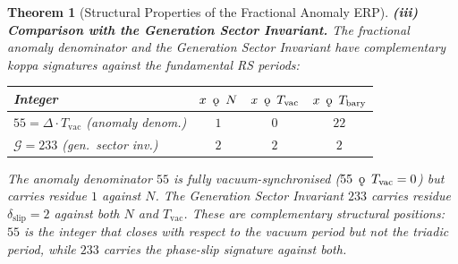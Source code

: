 \documentclass[11pt, letterpaper]{article}
\newcommand{\koppa}{\mathbin{\text{\rm\k{o}}}}
\theoremstyle{definition}
\theoremstyle{plain}
\newtheorem{theorem}{Theorem}[section]
\begin{document}
\begin{theorem}[Structural Properties of the Fractional Anomaly ERP]
\noindent\textbf{(iii) Comparison with the Generation Sector Invariant.}
The fractional anomaly denominator and the Generation Sector Invariant have
complementary koppa signatures against the fundamental RS periods:
\medskip
\begin{center}
\begin{tabular}{lccc}
\hline
Integer & $x \;\koppa\; N$ & $x \;\koppa\; T_\mathrm{vac}$ & $x \;\koppa\; T_\mathrm{bary}$ \\
\hline
$55 = \Delta \cdot T_\mathrm{vac}$ (anomaly denom.) & $1$ & $0$ & $22$ \\
$\mathcal{G} = 233$ (gen.\ sector inv.) & $2$ & $2$ & $2$ \\
\hline
\end{tabular}
\end{center}
\medskip
The anomaly denominator $55$ is fully vacuum-synchronised ($55 \;\koppa\; T_\mathrm{vac}
= 0$) but carries residue $1$ against $N$. The Generation Sector Invariant $233$
carries residue $\delta_\mathrm{slip} = 2$ against both $N$ and $T_\mathrm{vac}$.
These are complementary structural positions: $55$ is the integer that
\emph{closes} with respect to the vacuum period but not the triadic period, while
$233$ carries the phase-slip signature against both.
\end{theorem}
\end{document}
